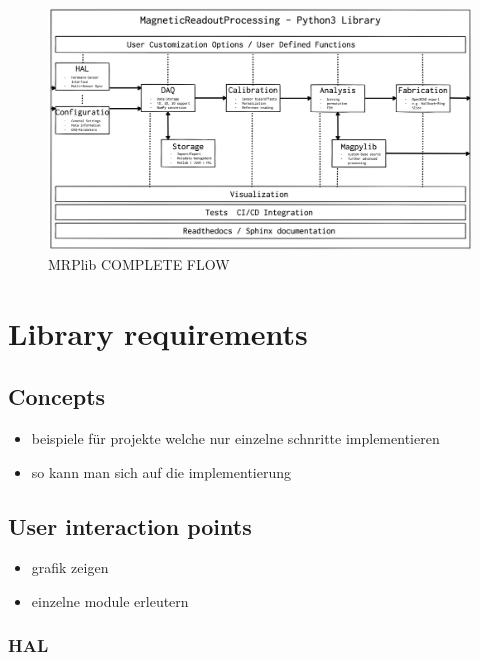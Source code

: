 \begin{figure}
\centering
\includegraphics{./generated_images/border_MRPlib_COMPLETE_FLOW.png}
\caption{MRPlib COMPLETE FLOW \label{MRPlib_COMPLETE_FLOW.png}}
\end{figure}

\hypertarget{library-requirements}{%
\section{Library requirements}\label{library-requirements}}

\hypertarget{concepts}{%
\subsection{Concepts}\label{concepts}}

\begin{itemize}
\tightlist
\item
  beispiele für projekte welche nur einzelne schnritte implementieren
\item
  so kann man sich auf die implementierung
\end{itemize}

\hypertarget{user-interaction-points}{%
\subsection{User interaction points}\label{user-interaction-points}}

\begin{itemize}
\tightlist
\item
  grafik zeigen
\item
  einzelne module erleutern
\end{itemize}

\hypertarget{hal}{%
\subsubsection{HAL}\label{hal}}


